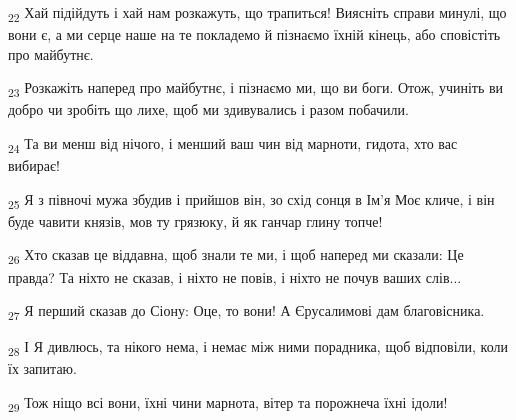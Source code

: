 \begin{tcolorbox}
\textsubscript{22} Хай підійдуть і хай нам розкажуть, що трапиться! Виясніть справи минулі, що вони є, а ми серце наше на те покладемо й пізнаємо їхній кінець, або сповістіть про майбутнє.
\end{tcolorbox}
\begin{tcolorbox}
\textsubscript{23} Розкажіть наперед про майбутнє, і пізнаємо ми, що ви боги. Отож, учиніть ви добро чи зробіть що лихе, щоб ми здивувались і разом побачили.
\end{tcolorbox}
\begin{tcolorbox}
\textsubscript{24} Та ви менш від нічого, і менший ваш чин від марноти, гидота, хто вас вибирає!
\end{tcolorbox}
\begin{tcolorbox}
\textsubscript{25} Я з півночі мужа збудив і прийшов він, зо схід сонця в Ім'я Моє кличе, і він буде чавити князів, мов ту грязюку, й як ганчар глину топче!
\end{tcolorbox}
\begin{tcolorbox}
\textsubscript{26} Хто сказав це віддавна, щоб знали те ми, і щоб наперед ми сказали: Це правда? Та ніхто не сказав, і ніхто не повів, і ніхто не почув ваших слів...
\end{tcolorbox}
\begin{tcolorbox}
\textsubscript{27} Я перший сказав до Сіону: Оце, то вони! А Єрусалимові дам благовісника.
\end{tcolorbox}
\begin{tcolorbox}
\textsubscript{28} І Я дивлюсь, та нікого нема, і немає між ними порадника, щоб відповіли, коли їх запитаю.
\end{tcolorbox}
\begin{tcolorbox}
\textsubscript{29} Тож ніщо всі вони, їхні чини марнота, вітер та порожнеча їхні ідоли!
\end{tcolorbox}
